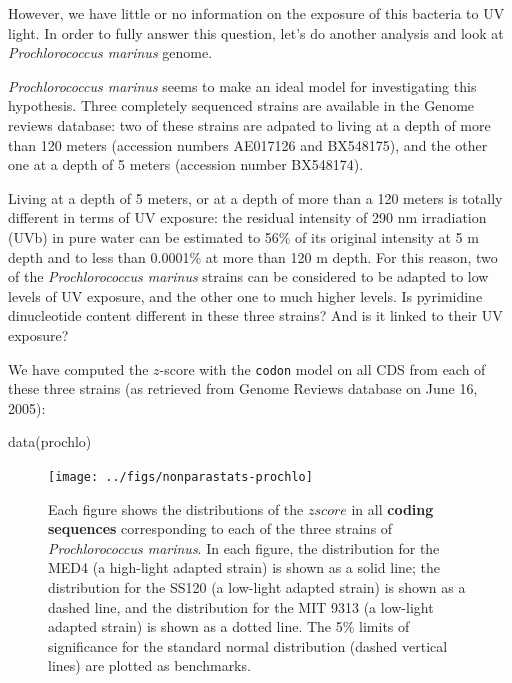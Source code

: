 \documentclass{article}
\begin{document}
However, we have little or no information on the exposure of this
bacteria to UV light. In order to fully answer this question, let's do
another analysis and look at \textit{Prochlorococcus marinus} genome.

\textit{Prochlorococcus marinus} seems to make an ideal model for
investigating this hypothesis. Three completely sequenced strains are
available in the Genome reviews database: two of these strains are
adpated to living at a depth of more than 120 meters (accession
numbers AE017126 and BX548175), and the other one at a depth of 5
meters (accession number BX548174).

Living at a depth of 5 meters, or at a depth of more than a 120 meters
is totally different in terms of UV exposure: the residual intensity
of 290 nm irradiation (UVb) in pure water can be estimated to 56\% of
its original intensity at 5 m depth and to less than 0.0001\% at more
than 120 m depth. For this reason, two of the \textit{Prochlorococcus
marinus} strains can be considered to be adapted to low levels of UV
exposure, and the other one to much higher levels. Is pyrimidine
dinucleotide content different in these three strains? And is it
linked to their UV exposure?

We have computed the $z$-score with the \texttt{codon} model on
all CDS from each of these three strains (as retrieved from Genome
Reviews database on June 16, 2005):

\begin{Schunk}
\begin{Sinput}
 data(prochlo)
\end{Sinput}
\end{Schunk}


\begin{figure}[H]
   \begin{center}
\texttt{[image: ../figs/nonparastats-prochlo]}
\end{center}
   \caption{Each figure shows the distributions of the $zscore$ in all
     \textbf{coding sequences} corresponding to each of the three
     strains of \textit{Prochlorococcus marinus}. In each figure, the
     distribution for the MED4 (a high-light adapted strain) is shown
     as a solid line; the distribution for the SS120 (a low-light
     adapted strain) is shown as a dashed line, and the distribution
     for the MIT 9313 (a low-light adapted strain) is shown as a
     dotted line. The 5\% limits of significance for the standard
     normal distribution (dashed vertical lines) are plotted as
     benchmarks.}
\label{prochlo}
\end{figure}
\end{document}
